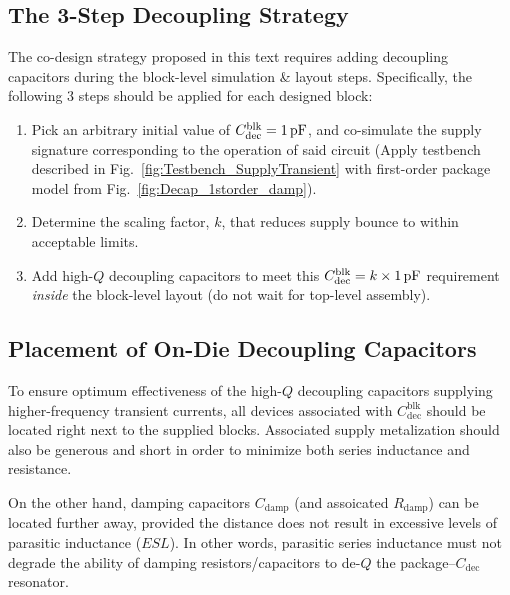 \subsection{The 3-Step Decoupling Strategy}
\par The co-design strategy proposed in this text requires adding decoupling
capacitors during the block-level simulation \& layout steps. Specifically, the
following 3 steps should be applied for each designed block:
%
\begin{enumerate}[noitemsep]
\item Pick an arbitrary initial value of $C_\mathrm{dec}^\mathrm{blk}=1\mathrm{\,pF}$, and co-simulate the supply signature corresponding to the operation of said circuit (Apply testbench described in Fig.~\ref{fig:Testbench_SupplyTransient} with first-order package model from Fig.~\ref{fig:Decap_1storder_damp}).
\item Determine the scaling factor, $k$, that reduces supply bounce to within acceptable limits.
\item Add high-$Q$ decoupling capacitors to meet this $C_\mathrm{dec}^\mathrm{blk}=k\times 1\mathrm{\,pF}$ requirement \emph{inside} the block-level layout (do not wait for top-level assembly).
\end{enumerate}
%
\subsection{Placement of On-Die Decoupling Capacitors}
\par To ensure optimum effectiveness of the high-$Q$ decoupling capacitors
supplying higher-frequency transient currents, all devices associated with
$C_\mathrm{dec}^\mathrm{blk}$ should be located right next to the supplied
blocks. Associated supply metalization should also be generous and short in
order to minimize both series inductance and resistance.
%
\par On the other hand, damping capacitors $C_\mathrm{damp}$ (and assoicated
$R_\mathrm{damp}$) can be located further away, provided the distance does
not result in excessive levels of parasitic inductance ($ESL$). In other words,
parasitic series inductance must not degrade the ability of damping
resistors/capacitors to de-$Q$ the package--$C_\mathrm{dec}$ resonator.
%
